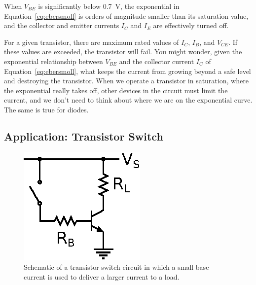 \documentclass[11pt]{article}
\begin{document}
When $V_{BE}$ is significantly below 0.7~V, the exponential in
Equation~\ref{eq:ebersmoll} is orders of magnitude smaller than its
saturation value, and the collector and emitter currents $I_C$ and
$I_E$ are effectively turned off. 

For a given transistor, there are maximum rated values of $I_C$,
$I_B$, and $V_{CE}$. If these values are exceeded, the transistor will
fail. You might wonder, given the exponential relationship between
$V_{BE}$ and the collector current $I_C$ of
Equation~\ref{eq:ebersmoll}, what keeps the current from growing
beyond a safe level and destroying the transistor. When we operate a
transistor in saturation, where the exponential really takes off,
other devices in the circuit must limit the current, and we don't need
to think about where we are on the exponential curve. The same is true
for diodes.

\vspace{12 pt}
\noindent
{}

\subsection{Application: Transistor Switch}
\label{sec:transistorswitch}

\begin{figure}[ht]
  \begin{center}
    \includegraphics{transistorswitch.eps}
    \caption{Schematic of a transistor switch circuit in which a small
      base current is used to deliver a larger current to a load.}
    \label{fig:transistorswitch}
  \end{center}
\end{figure}
\end{document}

